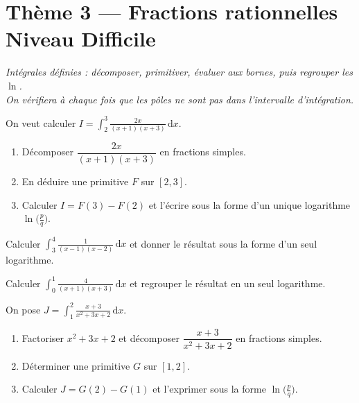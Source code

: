 \documentclass[11pt,a4paper]{article}
\newcommand{\dd}{\mathrm{d}}
\begin{document}
\section*{Thème 3 — Fractions rationnelles \quad\textbullet\quad Niveau Difficile}

\begin{center}\itshape
Intégrales définies : décomposer, primitiver, évaluer aux bornes, puis regrouper les $\ln$.\\
On vérifiera à chaque fois que les pôles ne sont pas dans l'intervalle d'intégration.
\end{center}

\begin{exo}[1 — guidé]
On veut calculer $\displaystyle I=\int_{2}^{3} \frac{2x}{(x+1)(x+3)}\,\dd x$.
\begin{enumerate}[label=\alph*),leftmargin=1.8em,topsep=2pt,itemsep=2pt]
  \item Décomposer $\dfrac{2x}{(x+1)(x+3)}$ en fractions simples.
  \item En déduire une primitive $F$ sur $[2,3]$.
  \item Calculer $I=F(3)-F(2)$ et l'écrire sous la forme d'un unique logarithme $\ln\!\big(\tfrac{p}{q}\big)$.
\end{enumerate}
\end{exo}

\begin{exo}[2]
Calculer $\displaystyle \int_{3}^{4} \frac{1}{(x-1)(x-2)}\,\dd x$ et donner le résultat sous la
forme d'un seul logarithme.
\end{exo}

\begin{exo}[3]
Calculer $\displaystyle \int_{0}^{1} \frac{4}{(x+1)(x+3)}\,\dd x$ et regrouper le résultat en un
seul logarithme.
\end{exo}

\begin{exo}
On pose $\displaystyle J=\int_{1}^{2} \frac{x+3}{x^2+3x+2}\,\dd x$.
\begin{enumerate}[label=\alph*),leftmargin=1.8em,topsep=2pt,itemsep=2pt]
  \item Factoriser $x^2+3x+2$ et décomposer $\dfrac{x+3}{x^2+3x+2}$ en fractions simples.
  \item Déterminer une primitive $G$ sur $[1,2]$.
  \item Calculer $J=G(2)-G(1)$ et l'exprimer sous la forme $\ln\!\big(\tfrac{p}{q}\big)$.
\end{enumerate}
\end{exo}
\end{document}
